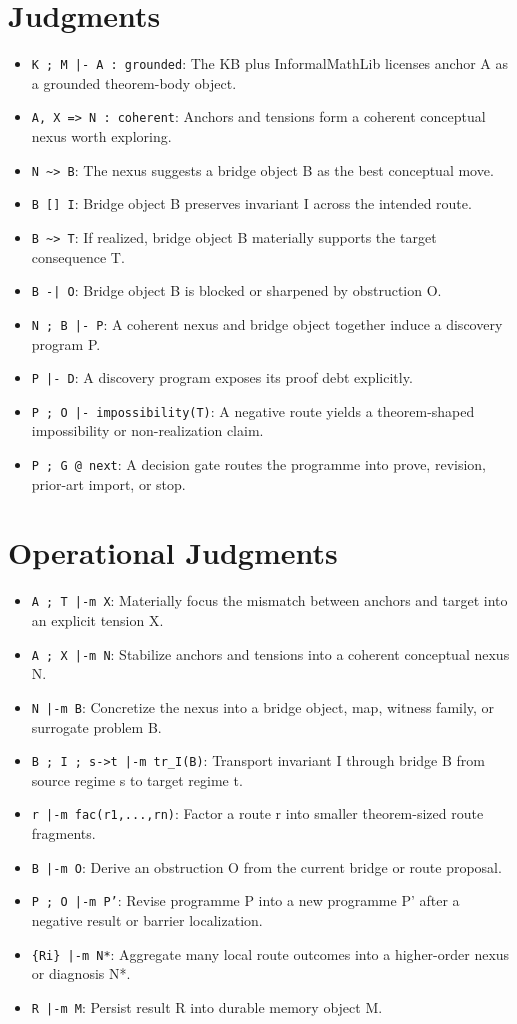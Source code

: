 \documentclass[11pt]{article}
\begin{document}
\section{Judgments}
\begin{itemize}[leftmargin=*,itemsep=0.25em]
\item \texttt{K ; M |- A : grounded}: The KB plus InformalMathLib licenses anchor A as a grounded theorem-body object.
\item \texttt{A, X => N : coherent}: Anchors and tensions form a coherent conceptual nexus worth exploring.
\item \texttt{N \textasciitilde{}> B}: The nexus suggests a bridge object B as the best conceptual move.
\item \texttt{B [] I}: Bridge object B preserves invariant I across the intended route.
\item \texttt{B \textasciitilde{}> T}: If realized, bridge object B materially supports the target consequence T.
\item \texttt{B -| O}: Bridge object B is blocked or sharpened by obstruction O.
\item \texttt{N ; B |- P}: A coherent nexus and bridge object together induce a discovery program P.
\item \texttt{P |- D}: A discovery program exposes its proof debt explicitly.
\item \texttt{P ; O |- impossibility(T)}: A negative route yields a theorem-shaped impossibility or non-realization claim.
\item \texttt{P ; G @ next}: A decision gate routes the programme into prove, revision, prior-art import, or stop.
\end{itemize}
\section{Operational Judgments}
\begin{itemize}[leftmargin=*,itemsep=0.25em]
\item \texttt{A ; T |-m X}: Materially focus the mismatch between anchors and target into an explicit tension X.
\item \texttt{A ; X |-m N}: Stabilize anchors and tensions into a coherent conceptual nexus N.
\item \texttt{N |-m B}: Concretize the nexus into a bridge object, map, witness family, or surrogate problem B.
\item \texttt{B ; I ; s->t |-m tr\_I(B)}: Transport invariant I through bridge B from source regime s to target regime t.
\item \texttt{r |-m fac(r1,...,rn)}: Factor a route r into smaller theorem-sized route fragments.
\item \texttt{B |-m O}: Derive an obstruction O from the current bridge or route proposal.
\item \texttt{P ; O |-m P'}: Revise programme P into a new programme P' after a negative result or barrier localization.
\item \texttt{\{Ri\} |-m N*}: Aggregate many local route outcomes into a higher-order nexus or diagnosis N*.
\item \texttt{R |-m M}: Persist result R into durable memory object M.
\end{itemize}
\end{document}
